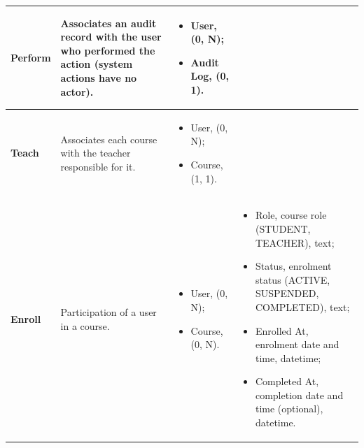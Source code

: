 {\begin{longtable}{|p{}|p{}|p{}|p{}|}
    \textbf{Perform} & Associates an audit record with the user who performed the action (system actions have no actor). &
    \begin{itemize}[leftmargin=*,nosep,before=\vspace{-\baselineskip}\leavevmode,after=\vspace{-\baselineskip}]
        \item User, (0, N);
        \item Audit Log, (0, 1).
    \end{itemize}
    &
    
    \\ \hline

    \textbf{Teach} & Associates each course with the teacher responsible for it. &
    \begin{itemize}[leftmargin=*,nosep,before=\vspace{-\baselineskip}\leavevmode,after=\vspace{-\baselineskip}]
        \item User, (0, N);
        \item Course, (1, 1).
    \end{itemize}
    &
    
    \\ \hline

    \textbf{Enroll} & Participation of a user in a course. &
    \begin{itemize}[leftmargin=*,nosep,before=\vspace{-\baselineskip}\leavevmode,after=\vspace{-\baselineskip}]
        \item User, (0, N);
        \item Course, (0, N).
    \end{itemize}
    &
    \begin{itemize}[leftmargin=*,nosep,before=\vspace{-\baselineskip}\leavevmode,after=\vspace{-\baselineskip}]
        \item Role, course role (STUDENT, TEACHER), text;
        \item Status, enrolment status (ACTIVE, SUSPENDED, COMPLETED), text;
        \item Enrolled At, enrolment date and time, datetime;
        \item Completed At, completion date and time (optional), datetime.
    \end{itemize}
    \\ \hline


\end{longtable}}

